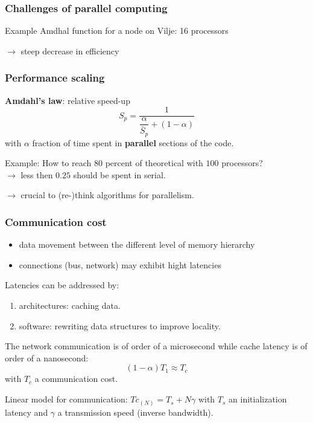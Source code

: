 \begin{frame}
  \frametitle{Challenges of parallel computing}

Example Amdhal function for a node on Vilje: 16 processors
 

$\rightarrow$ steep decrease in efficiency
\end{frame}


\begin{frame}
  \frametitle{Performance scaling}

\medskip
\textbf{Amdahl's law}: relative speed-up
\begin{equation*}
S_p = \dfrac{1}{\dfrac{\alpha}{\bar S_p} + (1 - \alpha)}
\end{equation*}
with $\alpha$ fraction of time spent in \textbf{parallel} sections of the code.

\medskip
Example: How to reach $80$ percent of theoretical with $100$ processors?\\[2ex]
$\rightarrow$ less then $0.25$ should be spent in serial.

\medskip
$\rightarrow$ crucial to (re-)think algorithms for parallelism.

\end{frame}

\begin{frame}
  \frametitle{Communication cost}

\begin{itemize}
\item data movement between the different level of memory hierarchy
\item connections (bus, network) may exhibit hight latencies
\end{itemize}

\medskip
Latencies can be addressed by:
\begin{enumerate}
\item architectures: caching data.
\item software: rewriting data structures to improve locality.
\end{enumerate}

\medskip
The network communication is of order of a microsecond while cache latency is of order of a nanosecond:
\begin{equation*}
(1-\alpha) T_1 \approx T_c
\end{equation*}
with $T_c$ a communication cost.

\medskip
Linear model for communication: $Tc_(N) = T_s + N \gamma$
with $T_s$ an initialization latency and $\gamma$ a transmission speed (inverse bandwidth).
\end{frame}


